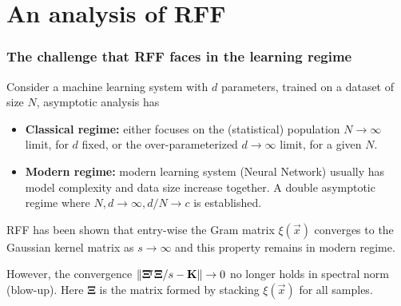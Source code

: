 \documentclass[10pt]{../formats/RU}
\begin{document}
\section{An analysis of RFF}
\begin{frame}
  \frametitle{The challenge that RFF faces in the learning regime}
  Consider a machine learning system with $d$ parameters, trained on a dataset of size $N$, asymptotic analysis has
  \begin{itemize}
    \item \textbf{Classical regime:} either focuses on the (statistical) population $N\rightarrow\infty$ limit, for $d$ fixed, or the over-parameterized $d\rightarrow\infty$ limit, for a given $N$.
    \item \textbf{Modern regime:} modern learning system (\eg Neural Network) usually has model complexity and data size increase together. A double asymptotic regime where $N, d\rightarrow\infty, d/N\rightarrow c$ is established. 
  \end{itemize}
  RFF has been shown that entry-wise the Gram matrix $\xi(\vec{x})$ converges to the Gaussian kernel matrix as $s\rightarrow\infty$ and this property remains in modern regime.

  However, the convergence $\lVert\mathbf{\Xi}{}^{\mkern-4mu\intercal}\mathbf{\Xi}/s-\mathbf{K}\rVert\rightarrow 0$ no longer holds in spectral norm (blow-up). Here $\mathbf{\Xi}$ is the matrix formed by stacking $\xi(\vec{x})$ for all samples.
\end{frame}
\end{document}
